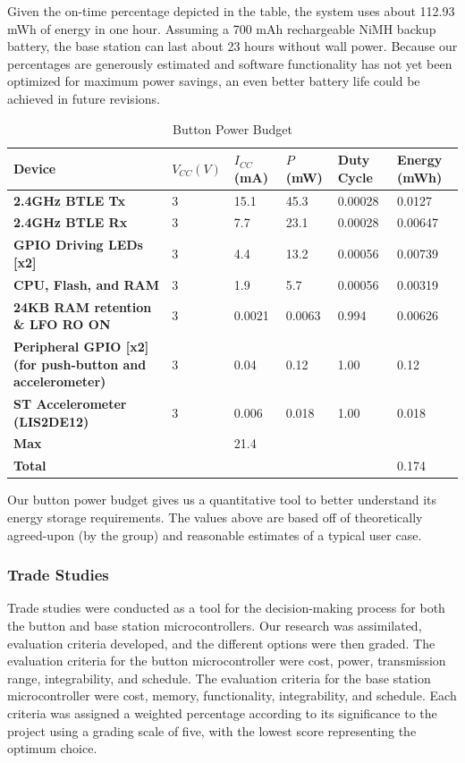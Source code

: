 \documentclass[journal,compsoc]{IEEEtran}
\begin{document}
Given the on-time percentage depicted in the table, the system uses about 112.93 mWh of energy in one hour. Assuming a 700 mAh rechargeable NiMH backup battery, the base station can last about 23 hours without wall power. Because our percentages are generously estimated and software functionality has not yet been optimized for maximum power savings, an even better battery life could be achieved in future revisions.

\begin{table}[t]
  \centering
  \begin{tabular}{>{\bfseries}l|l l l l l}
    Device & $V_{CC} (V)$ & $I_{CC}$ (mA) & $P$ (mW) & Duty Cycle & Energy (mWh) \\
    \hline
    2.4GHz BTLE Tx & 3 & 15.1 & 45.3 & 0.00028 & 0.0127 \\
    2.4GHz BTLE Rx & 3 & 7.7 & 23.1 & 0.00028 & 0.00647 \\
    GPIO Driving LEDs [x2] & 3 & 4.4 & 13.2 & 0.00056 & 0.00739 \\
    CPU, Flash, and RAM & 3 & 1.9 & 5.7 & 0.00056 & 0.00319 \\
    24KB RAM retention \& LFO RO ON & 3 & 0.0021 & 0.0063 & 0.994 & 0.00626 \\
    Peripheral GPIO [x2] (for push-button and accelerometer) & 3 & 0.04 & 0.12 & 1.00 & 0.12 \\
    ST Accelerometer (LIS2DE12) & 3 & 0.006 & 0.018 & 1.00 & 0.018 \\
    \hline
    Max & & 21.4 & & & \\
    Total & & & & & 0.174
  \end{tabular}
  \caption{Button Power Budget}
\end{table}

Our button power budget gives us a quantitative tool to better understand its energy storage requirements.  The values above are based off of theoretically agreed-upon (by the group) and reasonable estimates of a typical user case.

\subsubsection{Trade Studies}
Trade studies were conducted as a tool for the decision-making process for both the button and base station microcontrollers.  Our research was assimilated, evaluation criteria developed, and the different options were then graded. The evaluation criteria for the button microcontroller were cost, power, transmission range, integrability, and schedule.  The evaluation criteria for the base station microcontroller were cost, memory, functionality, integrability, and schedule.  Each criteria was assigned a weighted percentage according to its significance to the project using a grading scale of five, with the lowest score representing the optimum choice.
\end{document}
